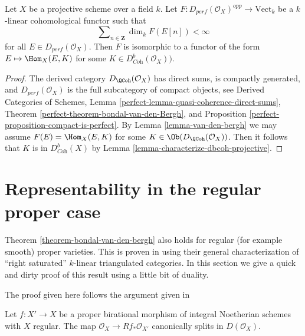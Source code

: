 \begin{theorem}
\label{theorem-bondal-van-den-bergh}
\begin{reference}
\cite[Theorem A.1]{BvdB}
\end{reference}
Let $X$ be a projective scheme over a field $k$.
Let $F : D_{perf}(\mathcal{O}_X)^{opp} \to \text{Vect}_k$
be a $k$-linear cohomological functor such that
$$
\sum\nolimits_{n \in \mathbf{Z}} \dim_k F(E[n]) < \infty
$$
for all $E \in D_{perf}(\mathcal{O}_X)$. Then $F$ is isomorphic to a functor
of the form $E \mapsto \Hom_X(E, K)$ for some
$K \in D^b_{\textit{Coh}}(\mathcal{O}_X))$.
\end{theorem}

\begin{proof}
The derived category $D_\QCoh(\mathcal{O}_X)$ has direct sums,
is compactly generated, and $D_{perf}(\mathcal{O}_X)$ is the full subcategory
of compact objects, see
Derived Categories of Schemes, Lemma
\ref{perfect-lemma-quasi-coherence-direct-sums},
Theorem \ref{perfect-theorem-bondal-van-den-Bergh}, and
Proposition \ref{perfect-proposition-compact-is-perfect}.
By Lemma \ref{lemma-van-den-bergh} we may assume
$F(E) = \Hom_X(E, K)$ for some $K \in \Ob(D_\QCoh(\mathcal{O}_X))$.
Then it follows that $K$ is in $D^b_{\textit{Coh}}(X)$
by Lemma \ref{lemma-characterize-dbcoh-projective}.
\end{proof}




\section{Representability in the regular proper case}
\label{section-regular-proper}

\noindent
Theorem \ref{theorem-bondal-van-den-bergh}
also holds for regular (for example smooth) proper varieties. This
is proven in \cite{BvdB} using their general characterization
of ``right saturated'' $k$-linear triangulated categories. In this
section we give a quick and dirty proof of this result using a little
bit of duality.

\begin{lemma}
\label{lemma-trace-map}
\begin{reference}
The proof given here follows the argument given in
\cite[Remark 3.4]{MS}
\end{reference}
Let $f : X' \to X$ be a proper birational morphism of integral Noetherian
schemes with $X$ regular. The map $\mathcal{O}_X \to Rf_*\mathcal{O}_{X'}$
canonically splits in $D(\mathcal{O}_X)$.
\end{lemma}


